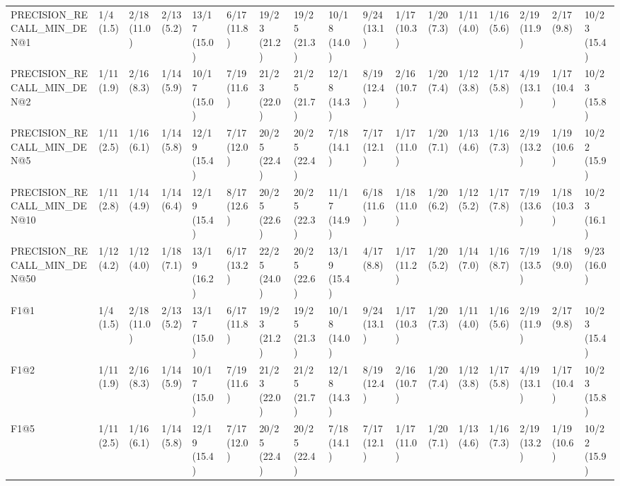 \begin{tabular}{lllllllllllllllll}
PRECISION_RECALL_MIN_DEN@1  &      1/4 (1.5) &    2/18 (11.0) &    2/13 (5.2) &   13/17 (15.0) &    6/17 (11.8) &      19/23 (21.2) &   19/25 (21.3) &  10/18 (14.0) &    9/24 (13.1) &  1/17 (10.3) &  1/20 (7.3) &     1/11 (4.0) &            1/16 (5.6) &         2/19 (11.9) &   2/17 (9.8) &  10/23 (15.4) \\
PRECISION_RECALL_MIN_DEN@2  &     1/11 (1.9) &     2/16 (8.3) &    1/14 (5.9) &   10/17 (15.0) &    7/19 (11.6) &      21/23 (22.0) &   21/25 (21.7) &  12/18 (14.3) &    8/19 (12.4) &  2/16 (10.7) &  1/20 (7.4) &     1/12 (3.8) &            1/17 (5.8) &         4/19 (13.1) &  1/17 (10.4) &  10/23 (15.8) \\
PRECISION_RECALL_MIN_DEN@5  &     1/11 (2.5) &     1/16 (6.1) &    1/14 (5.8) &   12/19 (15.4) &    7/17 (12.0) &      20/25 (22.4) &   20/25 (22.4) &   7/18 (14.1) &    7/17 (12.1) &  1/17 (11.0) &  1/20 (7.1) &     1/13 (4.6) &            1/16 (7.3) &         2/19 (13.2) &  1/19 (10.6) &  10/22 (15.9) \\
PRECISION_RECALL_MIN_DEN@10 &     1/11 (2.8) &     1/14 (4.9) &    1/14 (6.4) &   12/19 (15.4) &    8/17 (12.6) &      20/25 (22.6) &   20/25 (22.3) &  11/17 (14.9) &    6/18 (11.6) &  1/18 (11.0) &  1/20 (6.2) &     1/12 (5.2) &            1/17 (7.8) &         7/19 (13.6) &  1/18 (10.3) &  10/23 (16.1) \\
PRECISION_RECALL_MIN_DEN@50 &     1/12 (4.2) &     1/12 (4.0) &    1/18 (7.1) &   13/19 (16.2) &    6/17 (13.2) &      22/25 (24.0) &   20/25 (22.6) &  13/19 (15.4) &     4/17 (8.8) &  1/17 (11.2) &  1/20 (5.2) &     1/14 (7.0) &            1/16 (8.7) &         7/19 (13.5) &   1/18 (9.0) &   9/23 (16.0) \\
F1@1                        &      1/4 (1.5) &    2/18 (11.0) &    2/13 (5.2) &   13/17 (15.0) &    6/17 (11.8) &      19/23 (21.2) &   19/25 (21.3) &  10/18 (14.0) &    9/24 (13.1) &  1/17 (10.3) &  1/20 (7.3) &     1/11 (4.0) &            1/16 (5.6) &         2/19 (11.9) &   2/17 (9.8) &  10/23 (15.4) \\
F1@2                        &     1/11 (1.9) &     2/16 (8.3) &    1/14 (5.9) &   10/17 (15.0) &    7/19 (11.6) &      21/23 (22.0) &   21/25 (21.7) &  12/18 (14.3) &    8/19 (12.4) &  2/16 (10.7) &  1/20 (7.4) &     1/12 (3.8) &            1/17 (5.8) &         4/19 (13.1) &  1/17 (10.4) &  10/23 (15.8) \\
F1@5                        &     1/11 (2.5) &     1/16 (6.1) &    1/14 (5.8) &   12/19 (15.4) &    7/17 (12.0) &      20/25 (22.4) &   20/25 (22.4) &   7/18 (14.1) &    7/17 (12.1) &  1/17 (11.0) &  1/20 (7.1) &     1/13 (4.6) &            1/16 (7.3) &         2/19 (13.2) &  1/19 (10.6) &  10/22 (15.9) \\

\end{tabular}
